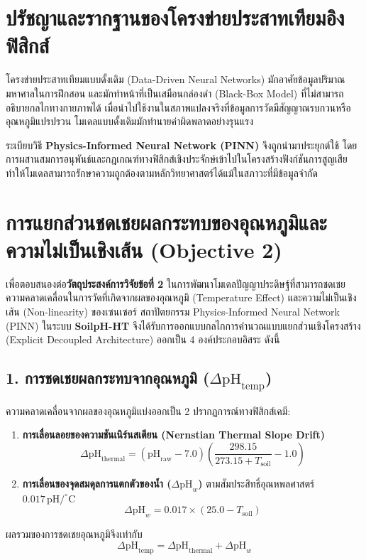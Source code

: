 \section{ปรัชญาและรากฐานของโครงข่ายประสาทเทียมอิงฟิสิกส์}

โครงข่ายประสาทเทียมแบบดั้งเดิม (Data-Driven Neural Networks) มักอาศัยข้อมูลปริมาณมหาศาลในการฝึกสอน และมักทำหน้าที่เป็นเสมือนกล่องดำ (Black-Box Model) ที่ไม่สามารถอธิบายกลไกทางกายภาพได้ เมื่อนำไปใช้งานในสภาพแปลงจริงที่ข้อมูลการวัดมีสัญญาณรบกวนหรืออุณหภูมิแปรปรวน โมเดลแบบดั้งเดิมมักทำนายค่าผิดพลาดอย่างรุนแรง

ระเบียบวิธี \textbf{Physics-Informed Neural Network (PINN)} จึงถูกนำมาประยุกต์ใช้ โดยการผสานสมการอนุพันธ์และกฎเกณฑ์ทางฟิสิกส์เชิงประจักษ์เข้าไปในโครงสร้างฟังก์ชันการสูญเสีย ทำให้โมเดลสามารถรักษาความถูกต้องตามหลักวิทยาศาสตร์ได้แม้ในสภาวะที่มีข้อมูลจำกัด

\section{การแยกส่วนชดเชยผลกระทบของอุณหภูมิและความไม่เป็นเชิงเส้น (Objective 2)}
\label{sec:decoupled_pinn_architecture}

เพื่อตอบสนองต่อ\textbf{วัตถุประสงค์การวิจัยข้อที่ 2} ในการพัฒนาโมเดลปัญญาประดิษฐ์ที่สามารถชดเชยความคลาดเคลื่อนในการวัดที่เกิดจากผลของอุณหภูมิ (Temperature Effect) และความไม่เป็นเชิงเส้น (Non-linearity) ของเซนเซอร์ สถาปัตยกรรม Physics-Informed Neural Network (PINN) ในระบบ \textbf{SoilpH-HT} จึงได้รับการออกแบบกลไกการคำนวณแบบแยกส่วนเชิงโครงสร้าง (Explicit Decoupled Architecture) ออกเป็น 4 องค์ประกอบอิสระ ดังนี้

\subsection{1. การชดเชยผลกระทบจากอุณหภูมิ ($\Delta \text{pH}_{\text{temp}}$)}
ความคลาดเคลื่อนจากผลของอุณหภูมิแบ่งออกเป็น 2 ปรากฏการณ์ทางฟิสิกส์เคมี:
\begin{enumerate}
    \item \textbf{การเลื่อนลอยของความชันเนิร์นสเตียน (Nernstian Thermal Slope Drift)}
    \begin{equation}
    \Delta \text{pH}_{\text{thermal}} = (\text{pH}_{\text{raw}} - 7.0)\left(\frac{298.15}{273.15 + T_{\text{soil}}} - 1.0\right)
    \end{equation}
    \item \textbf{การเลื่อนของจุดสมดุลการแตกตัวของน้ำ ($\Delta \text{pH}_w$)} ตามสัมประสิทธิ์อุณหพลศาสตร์ $0.017 \, \text{pH/}^\circ\text{C}$
    \begin{equation}
    \Delta \text{pH}_w = 0.017 \times (25.0 - T_{\text{soil}})
    \end{equation}
\end{enumerate}
ผลรวมของการชดเชยอุณหภูมิจึงเท่ากับ
\begin{equation}
\Delta \text{pH}_{\text{temp}} = \Delta \text{pH}_{\text{thermal}} + \Delta \text{pH}_w
\label{eq:delta_ph_temperature}
\end{equation}

